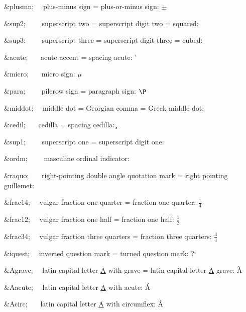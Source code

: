 \begin{DoxyItemize}
\item {\ttfamily \&plusmn;}{\ttfamily ~~} plus-\/minus sign = plus-\/or-\/minus sign\+: {$\pm$} 
\item {\ttfamily \&sup2;}{\ttfamily ~~~~} superscript two = superscript digit two = squared\+: \texttwosuperior{} 
\item {\ttfamily \&sup3;}{\ttfamily ~~~~} superscript three = superscript digit three = cubed\+: \textthreesuperior{} 
\item {\ttfamily \&acute;}{\ttfamily ~~~} acute accent = spacing acute\+: \'{} 
\item {\ttfamily \&micro;}{\ttfamily ~~~} micro sign\+: {$\mu$} 
\item {\ttfamily \&para;}{\ttfamily ~~~~} pilcrow sign = paragraph sign\+: {$\P$} 
\item {\ttfamily \&middot;}{\ttfamily ~~} middle dot = Georgian comma = Greek middle dot\+: \textperiodcentered{} 
\item {\ttfamily \&cedil;}{\ttfamily ~~~} cedilla = spacing cedilla\+: \c{} 
\item {\ttfamily \&sup1;}{\ttfamily ~~~~} superscript one = superscript digit one\+: \textonesuperior{} 
\item {\ttfamily \&ordm;}{\ttfamily ~~~~} masculine ordinal indicator\+: \textordmasculine{} 
\item {\ttfamily \&raquo;}{\ttfamily ~~~} right-\/pointing double angle quotation mark = right pointing guillemet\+: \guillemotright{} 
\item {\ttfamily \&frac14;}{\ttfamily ~~} vulgar fraction one quarter = fraction one quarter\+: {$\frac14$} 
\item {\ttfamily \&frac12;}{\ttfamily ~~} vulgar fraction one half = fraction one half\+: {$\frac12$} 
\item {\ttfamily \&frac34;}{\ttfamily ~~} vulgar fraction three quarters = fraction three quarters\+: {$\frac34$} 
\item {\ttfamily \&iquest;}{\ttfamily ~~} inverted question mark = turned question mark\+: ?` 
\item {\ttfamily \&Agrave;}{\ttfamily ~~} latin capital letter \mbox{\hyperlink{class_a}{A}} with grave = latin capital letter \mbox{\hyperlink{class_a}{A}} grave\+: \`{A} 
\item {\ttfamily \&Aacute;}{\ttfamily ~~} latin capital letter \mbox{\hyperlink{class_a}{A}} with acute\+: \'{A} 
\item {\ttfamily \&Acirc;}{\ttfamily ~~~} latin capital letter \mbox{\hyperlink{class_a}{A}} with circumflex\+: \^{A} 

\end{DoxyItemize}
